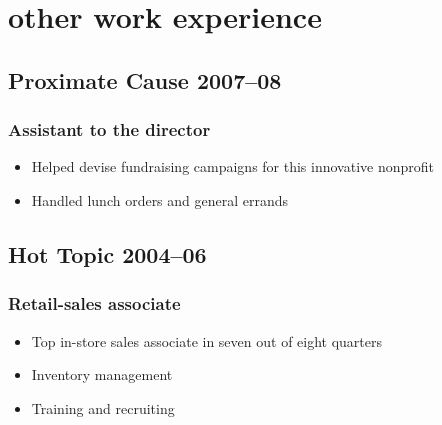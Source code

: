 \documentclass{article}
\begin{document}
\section{other work experience}
	\subsection{Proximate Cause \hfill 2007–08}
	\subsubsection{Assistant to the director}
	\begin{itemize}
		\item Helped devise fundraising campaigns for this innovative nonprofit
		\item Handled lunch orders and general errands
	\end{itemize}
	
	\subsection{Hot Topic \hfill 2004–06}
	\subsubsection{Retail-sales associate}
	\begin{itemize}
		\item Top in-store sales associate in seven out of eight quarters
		\item Inventory management
		\item Training and recruiting
	\end{itemize}
	
\end{document}
